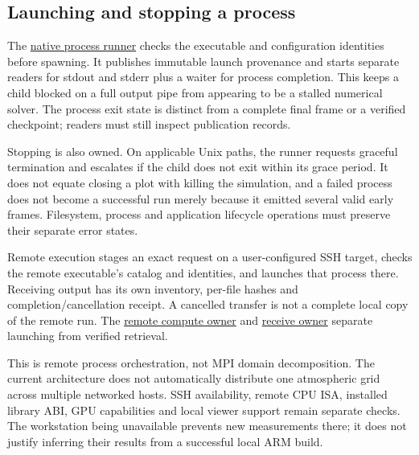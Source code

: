 \subsection{Launching and stopping a process}

The \href{../ui/src-tauri/src/commands/runner.rs}{native process runner}
checks the executable and configuration identities before spawning. It
publishes immutable launch provenance and starts separate readers for stdout
and stderr plus a waiter for process completion. This keeps a child blocked
on a full output pipe from appearing to be a stalled numerical solver. The
process exit state is distinct from a complete final frame or a verified
checkpoint; readers must still inspect publication records.

Stopping is also owned. On applicable Unix paths, the runner requests graceful
termination and escalates if the child does not exit within its grace period.
It does not equate closing a plot with killing the simulation, and a failed
process does not become a successful run merely because it emitted several
valid early frames. Filesystem, process and application lifecycle operations
must preserve their separate error states.

Remote execution stages an exact request on a user-configured SSH target,
checks the remote executable's catalog and identities, and launches that
process there. Receiving output has its own inventory, per-file hashes and
completion/cancellation receipt. A cancelled transfer is not a complete local
copy of the remote run. The
\href{../ui/src-tauri/src/commands/remote_compute.rs}{remote compute owner}
and \href{../ui/src-tauri/src/commands/remote_receive.rs}{receive owner}
separate launching from verified retrieval.

This is remote process orchestration, not MPI domain decomposition. The current
architecture does not automatically distribute one atmospheric grid across
multiple networked hosts. SSH availability, remote CPU ISA, installed library
ABI, GPU capabilities and local viewer support remain separate checks. The
workstation being unavailable prevents new measurements there; it does not
justify inferring their results from a successful local ARM build.
